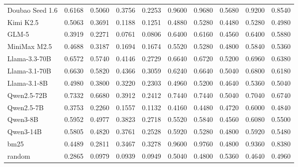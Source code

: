 \begin{table}[ht]
\begin{tabular}{l|cc|cc|ccccc}
Doubao Seed 1.6 & 0.6168 & 0.5060 & 0.3756 & 0.2253 & 0.9600 & 0.9680 & 0.5680 & 0.9200 & 0.8540 \\
Kimi K2.5 & 0.5063 & 0.3691 & 0.1188 & 0.1251 & 0.4880 & 0.5280 & 0.4480 & 0.5280 & 0.4980 \\
GLM-5 & 0.3919 & 0.2271 & 0.0761 & 0.0806 & 0.6400 & 0.6160 & 0.4560 & 0.6400 & 0.5880 \\
MiniMax M2.5 & 0.4688 & 0.3187 & 0.1694 & 0.1674 & 0.5520 & 0.5280 & 0.4800 & 0.5840 & 0.5360 \\
Llama-3.3-70B & 0.6572 & 0.5740 & 0.4146 & 0.2729 & 0.6640 & 0.6720 & 0.5200 & 0.6960 & 0.6380 \\
Llama-3.1-70B & 0.6630 & 0.5820 & 0.4366 & 0.3059 & 0.6240 & 0.6640 & 0.5040 & 0.6800 & 0.6180 \\
Llama-3.1-8B & 0.4980 & 0.3800 & 0.3220 & 0.2303 & 0.4960 & 0.5200 & 0.4640 & 0.5360 & 0.5040 \\
Qwen2.5-72B & 0.7332 & 0.6680 & 0.3912 & 0.2412 & 0.7440 & 0.7440 & 0.5040 & 0.7040 & 0.6740 \\
Qwen2.5-7B & 0.3753 & 0.2260 & 0.1557 & 0.1132 & 0.4160 & 0.4480 & 0.4720 & 0.6000 & 0.4840 \\
Qwen3-8B & 0.5952 & 0.4977 & 0.3823 & 0.2718 & 0.5520 & 0.5840 & 0.4560 & 0.6080 & 0.5500 \\
Qwen3-14B & 0.5805 & 0.4820 & 0.3761 & 0.2528 & 0.5920 & 0.5280 & 0.4800 & 0.5920 & 0.5480 \\
bm25 & 0.4489 & 0.2811 & 0.3467 & 0.3278 & 0.9600 & 0.9760 & 0.4800 & 0.9360 & 0.8380 \\
random & 0.2865 & 0.0979 & 0.0939 & 0.0949 & 0.5040 & 0.4800 & 0.5360 & 0.4640 & 0.4960 \\
\bottomrule
\end{tabular}
\end{table}

